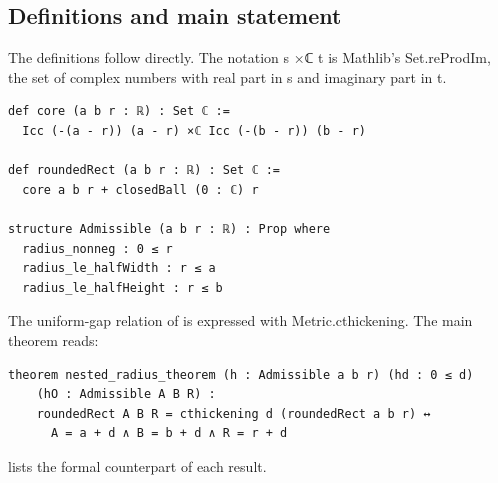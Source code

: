 \documentclass[a4paper,UKenglish,cleveref,autoref,thm-restate]{lipics-v2021}
\newcommand{\lean}[1]{{\leanfont #1}}
\begin{document}
\subsection{Definitions and main statement}

The definitions follow  directly. The notation \lean{s ×ℂ t} is Mathlib's
\lean{Set.reProdIm}, the set of complex numbers with real part in \lean{s} and imaginary part in
\lean{t}.

\begin{lstlisting}
def core (a b r : ℝ) : Set ℂ :=
  Icc (-(a - r)) (a - r) ×ℂ Icc (-(b - r)) (b - r)

def roundedRect (a b r : ℝ) : Set ℂ :=
  core a b r + closedBall (0 : ℂ) r

structure Admissible (a b r : ℝ) : Prop where
  radius_nonneg : 0 ≤ r
  radius_le_halfWidth : r ≤ a
  radius_le_halfHeight : r ≤ b
\end{lstlisting}

The uniform-gap relation of  is expressed with \lean{Metric.cthickening}. The main
theorem reads:

\begin{lstlisting}
theorem nested_radius_theorem (h : Admissible a b r) (hd : 0 ≤ d)
    (hO : Admissible A B R) :
    roundedRect A B R = cthickening d (roundedRect a b r) ↔
      A = a + d ∧ B = b + d ∧ R = r + d
\end{lstlisting}

 lists the formal counterpart of each result.
\end{document}
